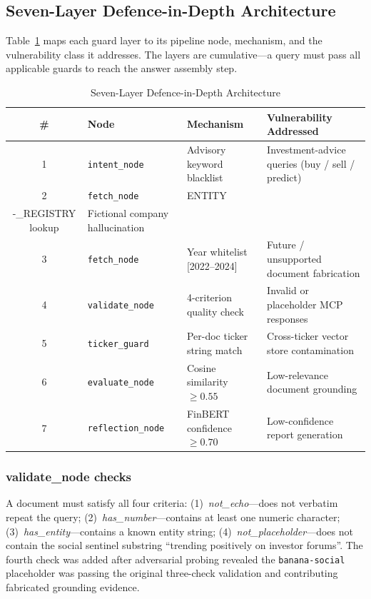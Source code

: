 \documentclass[10pt,twocolumn]{article}
\newcommand{\node}[1]{\texttt{#1}}
\begin{document}
\subsection{Seven-Layer Defence-in-Depth Architecture}

Table~\ref{tab:guards} maps each guard layer to its pipeline node,
mechanism, and the vulnerability class it addresses.
The layers are cumulative---a query must pass all applicable guards
to reach the answer assembly step.

\begin{table}[htbp]
\caption{Seven-Layer Defence-in-Depth Architecture}
\label{tab:guards}
\centering
\small
\begin{tabular}{@{}c p{2.8cm} p{4cm} p{5cm}@{}}
\toprule
\textbf{\#} & \textbf{Node} & \textbf{Mechanism} &
\textbf{Vulnerability Addressed} \\
\midrule
1 & \node{intent\_node}     & Advisory keyword blacklist    & Investment-advice queries (buy / sell / predict) \\
2 & \node{fetch\_node}      & ENTITY\\-\_REGISTRY lookup       & Fictional company hallucination \\
3 & \node{fetch\_node}      & Year whitelist [2022--2024]   & Future / unsupported document fabrication \\
4 & \node{validate\_node}   & 4-criterion quality check     & Invalid or placeholder MCP responses \\
5 & \node{ticker\_guard}    & Per-doc ticker string match   & Cross-ticker vector store contamination \\
6 & \node{evaluate\_node}   & Cosine similarity $\geq 0.55$ & Low-relevance document grounding \\
7 & \node{reflection\_node} & FinBERT confidence $\geq 0.70$& Low-confidence report generation \\
\bottomrule
\end{tabular}
\end{table}

\subsubsection{validate\_node checks}
A document must satisfy all four criteria:
(1)~\textit{not\_echo}---does not verbatim repeat the query;
(2)~\textit{has\_number}---contains at least one numeric character;
(3)~\textit{has\_entity}---contains a known entity string;
(4)~\textit{not\_placeholder}---does not contain the social sentinel
substring ``trending positively on investor forums''.
The fourth check was added after adversarial probing revealed the
\node{banana-social} placeholder was passing the original three-check
validation and contributing fabricated grounding evidence.
\end{document}
